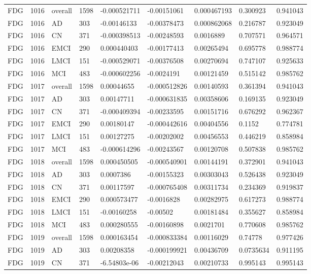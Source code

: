 \begin{landscape}
\begin{longtable}{lllllllll}
FDG & 1016 & overall & 1598 & -0.000521711 & -0.00151061 & 0.000467193 & 0.300923 & 0.941043 \\
FDG & 1016 & AD & 303 & -0.00146133 & -0.00378473 & 0.000862068 & 0.216787 & 0.923049 \\
FDG & 1016 & CN & 371 & -0.000398513 & -0.00248593 & 0.0016889 & 0.707571 & 0.964571 \\
FDG & 1016 & EMCI & 290 & 0.000440403 & -0.00177413 & 0.00265494 & 0.695778 & 0.988774 \\
FDG & 1016 & LMCI & 151 & -0.000529071 & -0.00376508 & 0.00270694 & 0.747107 & 0.925633 \\
FDG & 1016 & MCI & 483 & -0.000602256 & -0.0024191 & 0.00121459 & 0.515142 & 0.985762 \\
FDG & 1017 & overall & 1598 & 0.00044655 & -0.000512826 & 0.00140593 & 0.361394 & 0.941043 \\
FDG & 1017 & AD & 303 & 0.00147711 & -0.000631835 & 0.00358606 & 0.169135 & 0.923049 \\
FDG & 1017 & CN & 371 & -0.000409394 & -0.00233595 & 0.00151716 & 0.676292 & 0.962367 \\
FDG & 1017 & EMCI & 290 & 0.00180147 & -0.000442616 & 0.00404556 & 0.1152 & 0.774781 \\
FDG & 1017 & LMCI & 151 & 0.00127275 & -0.00202002 & 0.00456553 & 0.446219 & 0.858984 \\
FDG & 1017 & MCI & 483 & -0.000614296 & -0.00243567 & 0.00120708 & 0.507838 & 0.985762 \\
FDG & 1018 & overall & 1598 & 0.000450505 & -0.000540901 & 0.00144191 & 0.372901 & 0.941043 \\
FDG & 1018 & AD & 303 & 0.0007386 & -0.00155323 & 0.00303043 & 0.526438 & 0.923049 \\
FDG & 1018 & CN & 371 & 0.00117597 & -0.000765408 & 0.00311734 & 0.234369 & 0.919837 \\
FDG & 1018 & EMCI & 290 & 0.000573477 & -0.0016828 & 0.00282975 & 0.617273 & 0.988774 \\
FDG & 1018 & LMCI & 151 & -0.00160258 & -0.00502 & 0.00181484 & 0.355627 & 0.858984 \\
FDG & 1018 & MCI & 483 & 0.000280555 & -0.00160898 & 0.0021701 & 0.770608 & 0.985762 \\
FDG & 1019 & overall & 1598 & 0.000163454 & -0.000833384 & 0.00116029 & 0.74778 & 0.977426 \\
FDG & 1019 & AD & 303 & 0.00208358 & -0.000199921 & 0.00436709 & 0.0735634 & 0.911195 \\
FDG & 1019 & CN & 371 & -6.54803e-06 & -0.00212043 & 0.00210733 & 0.995143 & 0.995143 \\

\end{longtable}
\end{landscape}
